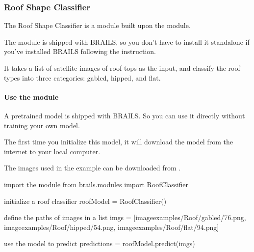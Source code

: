 \documentclass[letterpaper,10pt,english]{sphinxmanual}
\begin{document}
\subsubsection{Roof Shape Classifier}
\label{\detokenize{common/user_manual/modules/roofClassifier:roof-shape-classifier}}\label{\detokenize{common/user_manual/modules/roofClassifier:lbl-roofclassifier}}\label{\detokenize{common/user_manual/modules/roofClassifier::doc}}
\sphinxAtStartPar
The Roof Shape Classifier is a module built upon the {\hyperref[\detokenize{common/user_manual/modules/genericImageClassifier:lbl-genericimageclassifier}]{}} module.

\sphinxAtStartPar
The module is shipped with BRAILS,
so you don’t have to install it standalone if you’ve installed BRAILS following the {\hyperref[\detokenize{common/user_manual/installation:lbl-install}]{}} instruction.

\sphinxAtStartPar
It takes a list of satellite images of roof tops as the input, and classify the roof types into three categories: gabled, hipped, and flat.


\paragraph{Use the module}
\label{\detokenize{common/user_manual/modules/roofClassifier:use-the-module}}
\sphinxAtStartPar
A pretrained model is shipped with BRAILS. So you can use it directly without training your own model.

\sphinxAtStartPar
The first time you initialize this model, it will download the model from the internet to your local computer.

\sphinxAtStartPar
The images used in the example can be downloaded from .

\begin{sphinxVerbatim}[commandchars=\\\{\}]
\PYGZsh{} import the module
from brails.modules import RoofClassifier

\PYGZsh{} initialize a roof classifier
roofModel = RoofClassifier()

\PYGZsh{} define the paths of images in a list
imgs = [\PYGZsq{}image\PYGZus{}examples/Roof/gabled/76.png\PYGZsq{},
        \PYGZsq{}image\PYGZus{}examples/Roof/hipped/54.png\PYGZsq{},
        \PYGZsq{}image\PYGZus{}examples/Roof/flat/94.png\PYGZsq{}]

\PYGZsh{} use the model to predict
predictions = roofModel.predict(imgs)
\end{sphinxVerbatim}
\end{document}
